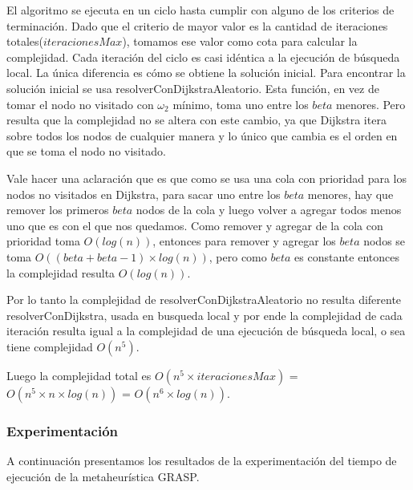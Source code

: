 El algoritmo se ejecuta en un ciclo hasta cumplir con alguno de los criterios de terminación. Dado que el criterio de mayor valor es la cantidad de iteraciones totales($iteracionesMax$), tomamos ese valor como cota para calcular la complejidad.
Cada iteración del ciclo es casi idéntica a la ejecución de búsqueda local. La única diferencia es cómo se obtiene la solución inicial. Para encontrar la solución inicial se usa resolverConDijkstraAleatorio. Esta función, en vez de tomar el nodo no visitado con $\omega_2$ mínimo, toma uno entre los $beta$ menores. Pero resulta que la complejidad no se altera con este cambio, ya que Dijkstra itera sobre todos los nodos de cualquier manera y lo único que cambia es el orden en que se toma el nodo no visitado. 

Vale hacer una aclaración que es que como se usa una cola con prioridad para los nodos no visitados en Dijkstra, para sacar uno entre los $beta$ menores, hay que remover los primeros $beta$ nodos de la cola y luego volver a agregar todos menos uno que es con el que nos quedamos. Como remover y agregar de la cola con prioridad toma $O(log(n))$, entonces para remover y agregar los $beta$ nodos se toma $O((beta + beta-1) \times log(n))$, pero como $beta$ es constante entonces la complejidad resulta $O(log(n))$. 

Por lo tanto la complejidad de resolverConDijkstraAleatorio no resulta diferente resolverConDijkstra, usada en busqueda local y por ende la complejidad de cada iteración resulta igual a la complejidad de una ejecución de búsqueda local, o sea tiene complejidad $O(n^5)$.

Luego la complejidad total es $O(n^5  \times  iteracionesMax)$ = $O(n^5  \times  n \times log(n))$ = $O(n^6  \times  log(n))$.

\subsubsection{Experimentación}

A continuación presentamos los resultados de la experimentación del tiempo de ejecución de la metaheurística GRASP.

